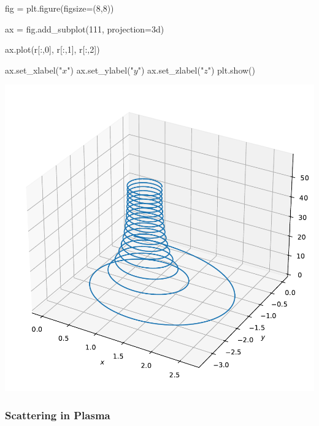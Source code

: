 \documentclass[
  letterpaper,
  DIV=11,
  numbers=noendperiod]{scrreprt}
\newenvironment{Shaded}{\begin{snugshade}}{\end{snugshade}}
\newcommand{\DecValTok}[1]{\textcolor[rgb]{0.68,0.00,0.00}{#1}}
\newcommand{\NormalTok}[1]{\textcolor[rgb]{0.00,0.23,0.31}{#1}}
\newcommand{\OperatorTok}[1]{\textcolor[rgb]{0.37,0.37,0.37}{#1}}
\newcommand{\StringTok}[1]{\textcolor[rgb]{0.13,0.47,0.30}{#1}}
\begin{document}
\begin{Shaded}
\begin{Highlighting}[]
\NormalTok{fig }\OperatorTok{=}\NormalTok{ plt.figure(figsize}\OperatorTok{=}\NormalTok{(}\DecValTok{8}\NormalTok{,}\DecValTok{8}\NormalTok{))}

\NormalTok{ax }\OperatorTok{=}\NormalTok{ fig.add\_subplot(}\DecValTok{111}\NormalTok{, projection}\OperatorTok{=}\StringTok{\textquotesingle{}3d\textquotesingle{}}\NormalTok{)}

\NormalTok{ax.plot(r[:,}\DecValTok{0}\NormalTok{], r[:,}\DecValTok{1}\NormalTok{], r[:,}\DecValTok{2}\NormalTok{])}

\NormalTok{ax.set\_xlabel(}\StringTok{"$x$"}\NormalTok{)}
\NormalTok{ax.set\_ylabel(}\StringTok{"$y$"}\NormalTok{)}
\NormalTok{ax.set\_zlabel(}\StringTok{"$z$"}\NormalTok{)}
\NormalTok{plt.show()}
\end{Highlighting}
\end{Shaded}

\includegraphics{chap2_files/figure-pdf/cell-9-output-1.pdf}

\subsubsection*{Scattering in Plasma}\label{scattering-in-plasma}
\end{document}
